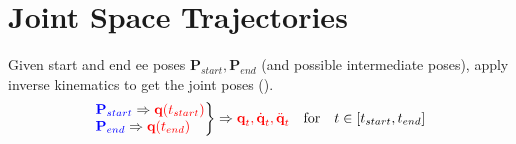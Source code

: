 \section{Joint Space Trajectories}
Given start and end \ac{ee} poses $\textbf{P}_{start}, \textbf{P}_{end}$ (and possible intermediate poses), apply inverse kinematics to get the joint poses ().
\begin{equation*}
	\left. \begin{matrix*}[l]
		{\color{blue} \textbf{P}_{start}} \Rightarrow {\color{red} \textbf{q}(t_{start})}\\
		{\color{blue} \textbf{P}_{end}} \Rightarrow {\color{red} \textbf{q}(t_{end})}
	\end{matrix*} \right\} \Rightarrow {\color{red} \textbf{q}_t, \dot{\textbf{q}}_t, \ddot{\textbf{q}}_t} \quad\text{for}\quad t\in[t_{start}, t_{end}]
\end{equation*}

